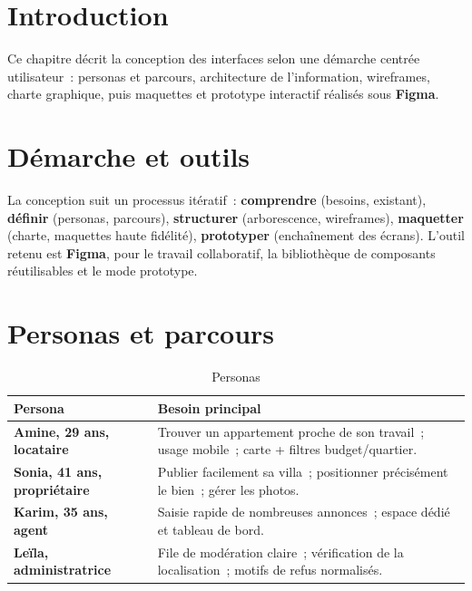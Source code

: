 
\section*{Introduction}
Ce chapitre décrit la conception des interfaces selon une démarche centrée
utilisateur~: personas et parcours, architecture de l'information, wireframes,
charte graphique, puis maquettes et prototype interactif réalisés sous
\textbf{Figma}.

\section{Démarche et outils}
\label{sec:demarche-ux}
La conception suit un processus itératif~: \textbf{comprendre} (besoins,
existant), \textbf{définir} (personas, parcours), \textbf{structurer}
(arborescence, wireframes), \textbf{maquetter} (charte, maquettes haute
fidélité), \textbf{prototyper} (enchaînement des écrans). L'outil retenu est
\textbf{Figma}, pour le travail collaboratif, la bibliothèque de composants
réutilisables et le mode prototype.

\section{Personas et parcours}
\label{sec:personas}

\begin{table}[H]
\centering
\renewcommand{\arraystretch}{1.25}
\begin{tabularx}{\linewidth}{>{\bfseries}p{3cm} X}
\toprule
Persona & Besoin principal \\
\midrule
Amine, 29 ans, locataire & Trouver un appartement proche de son travail~; usage mobile~; carte + filtres budget/quartier. \\
Sonia, 41 ans, propriétaire & Publier facilement sa villa~; positionner précisément le bien~; gérer les photos. \\
Karim, 35 ans, agent & Saisie rapide de nombreuses annonces~; espace dédié et tableau de bord. \\
Leïla, administratrice & File de modération claire~; vérification de la localisation~; motifs de refus normalisés. \\
\bottomrule
\end{tabularx}
\caption{Personas}
\label{tab:personas}
\end{table}

